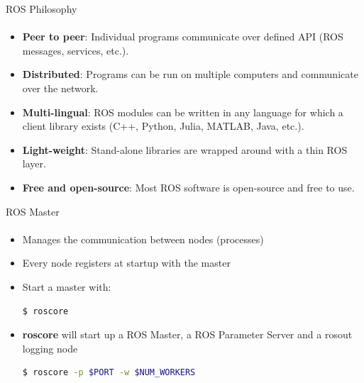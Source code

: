 \documentclass[aspectratio=169]{beamer}
\begin{document}
\begin{frame}{ROS Philosophy}
	\framesubtitle{}
	\begin{itemize}
		
		\item \textbf{Peer to peer}: Individual programs communicate over defined API (ROS messages, services, etc.).
		\item \textbf{Distributed}: Programs can be run on multiple computers and communicate over the network.
		\item \textbf{Multi-lingual}: ROS modules can be written in any language for which a client library exists (C++, Python, Julia, MATLAB, Java, etc.).
		\item \textbf{Light-weight}: Stand-alone libraries are wrapped around with a thin ROS layer.
		\item \textbf{Free and open-source}: Most ROS software is open-source and free to use.

	\end{itemize}
\end{frame}


\begin{frame}[fragile]{ROS Master}
	\framesubtitle{ }
	\begin{minipage}{0.6\textwidth}
    \begin{itemize}
        \item Manages the communication between nodes (processes)
        \item Every node registers at startup with the master
    \end{itemize}
	
	\vspace{0.3in}

	\begin{itemize}
		\item Start a master with:

		\begin{lstlisting}[language=bash]
	$ roscore
		\end{lstlisting}

		\item \textbf{roscore} will start up a ROS Master, a ROS Parameter Server and a rosout logging node
		
		\begin{lstlisting}[language=bash]
	$ roscore -p $PORT -w $NUM_WORKERS
		\end{lstlisting}
		\end{itemize}

	\end{minipage}
	\begin{minipage}{0.4\textwidth}
		
	\end{minipage}
\end{frame}
\end{document}
